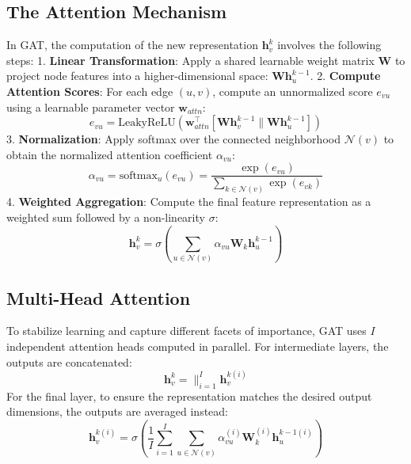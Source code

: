 \subsection{The Attention Mechanism}
In GAT, the computation of the new representation $\mathbf{h}_v^k$ involves the following steps:
1. \textbf{Linear Transformation}: Apply a shared learnable weight matrix $\mathbf{W}$ to project node features into a higher-dimensional space: $\mathbf{W}\mathbf{h}_u^{k-1}$.
2. \textbf{Compute Attention Scores}: For each edge $(u,v)$, compute an unnormalized score $e_{vu}$ using a learnable parameter vector $\mathbf{w}_{attn}$:
\begin{equation}
    e_{vu} = \text{LeakyReLU} \left( \mathbf{w}_{attn}^\top [ \mathbf{W}\mathbf{h}_v^{k-1} \| \mathbf{W}\mathbf{h}_u^{k-1} ] \right)
\end{equation}
3. \textbf{Normalization}: Apply softmax over the connected neighborhood $\mathcal{N}(v)$ to obtain the normalized attention coefficient $\alpha_{vu}$:
\begin{equation}
    \alpha_{vu} = \text{softmax}_u(e_{vu}) = \frac{\exp(e_{vu})}{\sum_{k \in \mathcal{N}(v)} \exp(e_{vk})}
\end{equation}
4. \textbf{Weighted Aggregation}: Compute the final feature representation as a weighted sum followed by a non-linearity $\sigma$:
\begin{equation}
    \mathbf{h}_v^k = \sigma \left( \sum_{u \in \mathcal{N}(v)} \alpha_{vu} \mathbf{W}_k \mathbf{h}_u^{k-1} \right)
\end{equation}

\subsection{Multi-Head Attention}
To stabilize learning and capture different facets of importance, GAT uses $I$ independent attention heads computed in parallel. For intermediate layers, the outputs are concatenated:
\begin{equation}
    \mathbf{h}_v^k = \Big\|_{i=1}^I \mathbf{h}_v^{k(i)}
\end{equation}
For the final layer, to ensure the representation matches the desired output dimensions, the outputs are averaged instead:
\begin{equation}
    \mathbf{h}_v^{k(i)} = \sigma \left( \frac{1}{I} \sum_{i=1}^I \sum_{u \in \mathcal{N}(v)} \alpha_{vu}^{(i)} \mathbf{W}_k^{(i)} \mathbf{h}_u^{k-1(i)} \right)
\end{equation}


